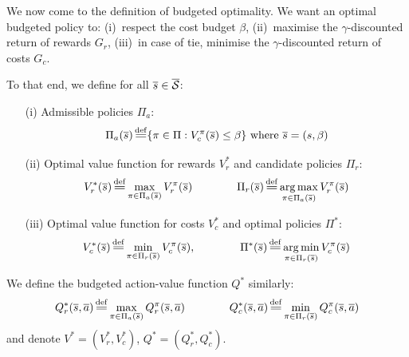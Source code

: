 We now come to the definition of budgeted optimality. We want an optimal budgeted policy to: (i)~respect the cost budget $\beta$, (ii)~maximise the $\gamma$-discounted return of rewards $G_r$, (iii)~in case of tie, minimise the $\gamma$-discounted return of costs $G_c$.

\begin{definition}
	\begin{leftbar}[defnbar]
	To that end, we define for all $\overline{s}\in\overline{\mathcal{S}}$:
	\begin{enumerate}
		\item[(i)] Admissible policies $\Pi_a$: 
		\begin{equation}
		\Pi_a(\os) \eqdef \{\pi\in\Pi: V_c^\pi(\os) \leq \beta\}\text{ where }\os = (s, \beta)
		\end{equation}
		\item[(ii)] Optimal value function for rewards $V_r^*$ and candidate policies $\Pi_r$: 
		\begin{equation}
		V_r^*(\os) \eqdef \max_{\pi\in\Pi_a(\os)}  V_r^\pi(\os) \qquad\qquad \Pi_r(\os) \eqdef \argmax_{\pi\in\Pi_a(\os)}  V_r^\pi(\os)
		\end{equation}
		\item[(iii)] Optimal value function for costs $V_c^*$ and optimal policies $\Pi^*$: 
		\begin{equation}
		V_c^*(\os) \eqdef \min_{\pi\in\Pi_r(\os)}  V_c^\pi(\os), \qquad\qquad \Pi^*(\os) \eqdef \argmin_{\pi\in\Pi_r(\os)}  V_c^\pi(\os)
		\end{equation}
	\end{enumerate}
	We define the budgeted action-value function $Q^*$ similarly:
	\begin{equation}
	Q_r^*(\os, \oa) \eqdef \max_{\pi\in\Pi_a(\os)}  Q_r^\pi(\os, \oa) \qquad\qquad Q_c^*(\os, \oa) \eqdef \min_{\pi\in\Pi_r(\os)}  Q_c^\pi(\os, \oa) 
	\end{equation}
	and denote $V^* = (V_r^*, V_c^*)$, $Q^* = (Q_r^*, Q_c^*)$.
	\end{leftbar}
\end{definition}

